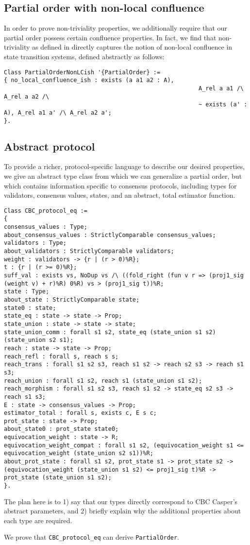 \subsection{Partial order with non-local confluence} 
In order to prove non-triviality properties, we additionally require  that our partial order possess certain confluence properties. In fact, we find that non-triviality as defined in \cite{CBCfull} directly captures the notion of non-local confluence in state transition systems, defined abstractly as follows: 

\begin{lstlisting}
Class PartialOrderNonLCish '{PartialOrder} :=
{ no_local_confluence_ish : exists (a a1 a2 : A),
														A_rel a a1 /\ A_rel a a2 /\
														~ exists (a' : A), A_rel a1 a' /\ A_rel a2 a';
}. 
\end{lstlisting}

\subsection{Abstract protocol} 
To provide a richer, protocol-specific language to describe our desired properties, we give an abstract type class from which we can generalize a partial order, but which contains information specific to consensus protocols, including types for validators, consensus values, states, and an abstract, total estimator function. 
\begin{lstlisting}
Class CBC_protocol_eq :=
{
consensus_values : Type; 
about_consensus_values : StrictlyComparable consensus_values; 
validators : Type; 
about_validators : StrictlyComparable validators;
weight : validators -> {r | (r > 0)%R}; 
t : {r | (r >= 0)%R}; 
suff_val : exists vs, NoDup vs /\ ((fold_right (fun v r => (proj1_sig (weight v) + r)%R) 0%R) vs > (proj1_sig t))%R;
state : Type;
about_state : StrictlyComparable state;
state0 : state;
state_eq : state -> state -> Prop;
state_union : state -> state -> state;
state_union_comm : forall s1 s2, state_eq (state_union s1 s2) (state_union s2 s1);
reach : state -> state -> Prop;
reach_refl : forall s, reach s s; 
reach_trans : forall s1 s2 s3, reach s1 s2 -> reach s2 s3 -> reach s1 s3; 
reach_union : forall s1 s2, reach s1 (state_union s1 s2);  
reach_morphism : forall s1 s2 s3, reach s1 s2 -> state_eq s2 s3 -> reach s1 s3;  
E : state -> consensus_values -> Prop; 
estimator_total : forall s, exists c, E s c; 
prot_state : state -> Prop; 
about_state0 : prot_state state0; 
equivocation_weight : state -> R; 
equivocation_weight_compat : forall s1 s2, (equivocation_weight s1 <= equivocation_weight (state_union s2 s1))%R; 
about_prot_state : forall s1 s2, prot_state s1 -> prot_state s2 ->
(equivocation_weight (state_union s1 s2) <= proj1_sig t)%R -> prot_state (state_union s1 s2);
}.
\end{lstlisting}

The plan here is to 1) say that our types directly correspond to CBC Casper's abstract parameters, and 2) briefly explain why the additional properties about each type are required.

We prove that \verb|CBC_protocol_eq| can derive \verb|PartialOrder|. 